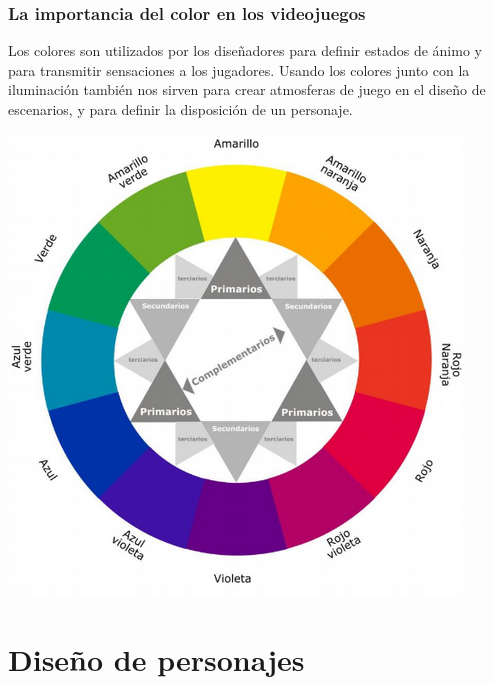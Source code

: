 \documentclass[11pt]{beamer}
\begin{document}
\begin{frame}
\frametitle{La importancia del color en los videojuegos}
Los colores son utilizados por los diseñadores para definir estados de ánimo y para transmitir sensaciones a los jugadores. Usando los colores junto con la iluminación también nos sirven para crear atmosferas de juego en el diseño de escenarios, y para definir la disposición de un personaje.

\begin{center}
 \includegraphics[scale=0.3,keepaspectratio=true]{img/colorgama.png}
\end{center}

\end{frame}
\section{Diseño de personajes}
\end{document}
